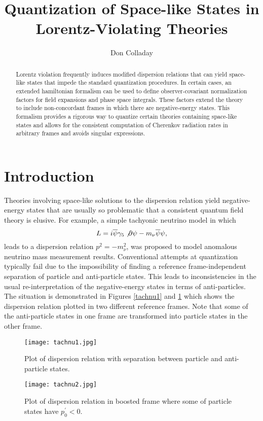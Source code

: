 \documentclass[a4paper]{jpconf}
\def\ga{\gamma}
\begin{document}
\title{Quantization of Space-like States in Lorentz-Violating Theories}

\author{Don Colladay}

\address{New College of Florida, Sarasota, FL 34234, USA}


\begin{abstract}
Lorentz violation frequently induces modified dispersion relations that can yield 
space-like states that impede the standard quantization procedures.  
In certain cases, an extended hamiltonian formalism can 
be used to define observer-covariant normalization factors for field expansions and phase space 
integrals.  These factors extend the theory to include non-concordant frames in which there 
are negative-energy states.  This formalism provides a rigorous way to quantize certain 
theories containing space-like states and allows for the consistent computation of Cherenkov
radiation rates in arbitrary frames and avoids singular expressions.
\end{abstract}

\section{Introduction}
Theories involving space-like solutions to the dispersion relation yield negative-energy 
states that are usually so problematic that a consistent quantum field theory is elusive.
For example, a simple tachyonic neutrino model \cite{chodos} in which 
$$
L = i \overline \psi \ga_5 \not \partial \psi - m_\nu \overline \psi \psi,
$$
leads to a dispersion relation $p^2 = - m_\nu^2$, was proposed to model anomalous
neutrino mass measurement results.
Conventional attempts at quantization typically fail due to the impossibility of finding a 
reference frame-independent separation of particle and anti-particle states.
This leads to inconsistencies in the usual re-interpretation of the negative-energy states
in terms of anti-particles.
The situation is demonstrated in Figures \ref{tachnu1} and \ref{tachnu2} which shows the 
dispersion relation plotted in two different reference frames.  
Note that some of the anti-particle states in one frame are transformed into particle states in the 
other frame.
\begin{figure}[h]
\begin{minipage}{18pc}
\texttt{[image: tachnu1.jpg]}
\caption{\label{tachnu1}Plot of dispersion relation with separation between particle and anti-particle
states.}
\end{minipage}\hspace{2pc}%
\begin{minipage}{18pc}
\texttt{[image: tachnu2.jpg]}
\caption{\label{tachnu2}Plot of dispersion relation in boosted frame where some of 
particle states have $p_0^\prime < 0$.}
\end{minipage} 
\end{figure}
\end{document}
